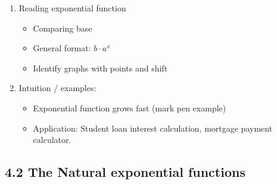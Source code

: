 \documentclass{article}
\begin{document}
\begin{enumerate}
\item Reading exponential function
\begin{itemize}
\item Comparing base 
\item General format: $b\cdot a^x$
\item Identify graphs with points and shift
\end{itemize}

\item Intuition / examples:
\begin{itemize}
\item Exponential function grows fast (mark pen example)
\item Application: Student loan interest calculation, mortgage payment calculator. 
\end{itemize}
\end{enumerate}


\subsection{4.2 The Natural exponential functions}
\end{document}
